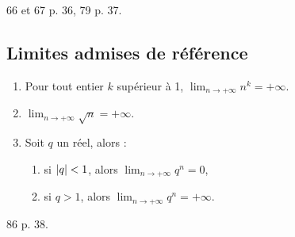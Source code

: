 \documentclass[a4paper,11pt,DIV20,BCOR0mm]{scrartcl}
\begin{document}
\begin{exercice}
 66 et 67 p. 36, 79 p. 37.
\end{exercice}


\subsection{Limites admises de référence}
\begin{theoreme}[Admis]
 \begin{enumerate}
  \item Pour tout entier $k$ supérieur à 1, $\displaystyle\lim_{n\to+\infty}n^k=+\infty$.
  \item $\displaystyle\lim_{n\to+\infty}\sqrt{n}=+\infty$.
  \item Soit $q$ un réel, alors :
      \begin{enumerate}
	\item si $\left\lvert q\right\rvert<1$, alors $\displaystyle\lim_{n\to+\infty}q^n=0$,
	\item si $q>1$, alors $\displaystyle\lim_{n\to+\infty}q^n=+\infty$.
      \end{enumerate}
 \end{enumerate}
\end{theoreme}

\begin{exercice}
 86 p. 38.
\end{exercice}
\end{document}
